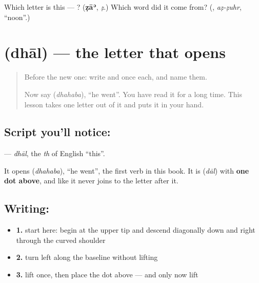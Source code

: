 \begin{tcolorbox}[breakable,colback=teal!4,colframe=teal!35!black,title={Before you move on}]
Which letter is this — ? (\textbf{ẓāʾ}, \emph{ẓ}.) Which word did it come from? (\textbf{}, \emph{aẓ-ẓuhr}, \textquotedblleft{}noon\textquotedblright{}.)
\end{tcolorbox}
\section[\texorpdfstring{\ar{ذ} (dhāl)}{ذ (dhāl)}]{ (dhāl) — the letter that opens }

\label{lesson:AR-W49-dhal}



\begin{quote}
Before the new one: write  and  once each, and name them.

Now say \textbf{} (\emph{dhahaba}), \textquotedblleft{}he went\textquotedblright{}. You have read it for a long time. This lesson takes one letter out of it and puts it in your hand.
\end{quote}

\subsection*{Script you'll notice: }
\textbf{} — \emph{dhāl}, the \emph{th} of English \textquotedblleft{}this\textquotedblright{}.

It opens \textbf{} (\emph{dhahaba}), \textquotedblleft{}he went\textquotedblright{}, the first verb in this book. It is \textbf{} (\emph{dāl}) with \textbf{one dot above}, and like \textbf{} it never joins to the letter after it.

\subsection*{Writing: }

\begin{itemize}
\raggedright
  \item \textbf{1.} start here: begin at the upper tip and descend diagonally down and right through the curved shoulder
  \item \textbf{2.} turn left along the baseline without lifting
  \item \textbf{3.} lift once, then place the dot above — and only now lift
\end{itemize}

